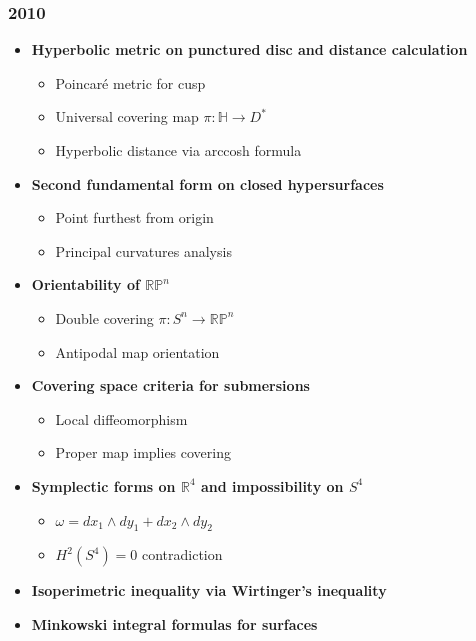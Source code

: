 \subsubsection*{2010}
\begin{itemize}
    \item \textbf{Hyperbolic metric on punctured disc and distance calculation}
        \begin{itemize}
            \item Poincaré metric for cusp
            \item Universal covering map $\pi: \mathbb{H} \to D^*$
            \item Hyperbolic distance via arccosh formula
        \end{itemize}
    \item \textbf{Second fundamental form on closed hypersurfaces}
        \begin{itemize}
            \item Point furthest from origin
            \item Principal curvatures analysis
        \end{itemize}
    \item \textbf{Orientability of $\mathbb{RP}^n$}
        \begin{itemize}
            \item Double covering $\pi: S^n \to \mathbb{RP}^n$
            \item Antipodal map orientation
        \end{itemize}
    \item \textbf{Covering space criteria for submersions}
        \begin{itemize}
            \item Local diffeomorphism
            \item Proper map implies covering
        \end{itemize}
    \item \textbf{Symplectic forms on $\mathbb{R}^4$ and impossibility on $S^4$}
        \begin{itemize}
            \item $\omega = dx_1 \wedge dy_1 + dx_2 \wedge dy_2$
            \item $H^2(S^4) = 0$ contradiction
        \end{itemize}
    \item \textbf{Isoperimetric inequality via Wirtinger's inequality}
    \item \textbf{Minkowski integral formulas for surfaces}

\end{itemize}
